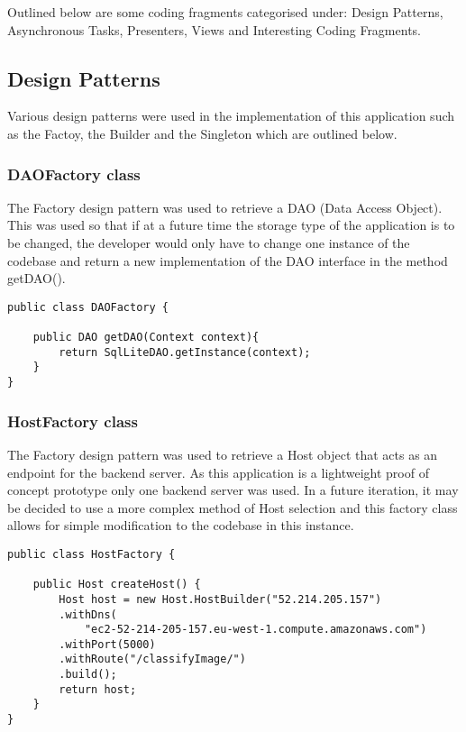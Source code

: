 Outlined below are some coding fragments categorised under: Design Patterns, Asynchronous Tasks, Presenters, Views and Interesting Coding Fragments.

\tocless\subsection{Design Patterns}
Various design patterns were used in the implementation of this application such as the Factoy, the Builder and the Singleton which are outlined below.

\tocless\subsubsection{DAOFactory class}
The Factory design pattern was used to retrieve a DAO (Data Access Object).
This was used so that if at a future time the storage type of the application is to be changed, the developer would only have to change one instance of the codebase and return a new implementation of the DAO interface in the method getDAO().
\begin{lstlisting}[style=Java]
public class DAOFactory {

    public DAO getDAO(Context context){
        return SqlLiteDAO.getInstance(context);
    }
}
\end{lstlisting}

\tocless\subsubsection{HostFactory class}
The Factory design pattern was used to retrieve a Host object that acts as an endpoint for the backend server.
As this application is a lightweight proof of concept prototype only one backend server was used.
In a future iteration, it may be decided to use a more complex method of Host selection and this factory class allows for simple modification to the codebase in this instance.
\begin{lstlisting}[style=Java]
public class HostFactory {

    public Host createHost() {
        Host host = new Host.HostBuilder("52.214.205.157")
        .withDns(
            "ec2-52-214-205-157.eu-west-1.compute.amazonaws.com")
        .withPort(5000)
        .withRoute("/classifyImage/")
        .build();
        return host;
    }
}
\end{lstlisting}

